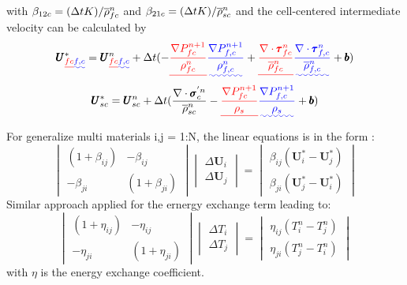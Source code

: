 \documentclass[preprint,12pt]{elsarticle}
\providecommand{\DIFadd}[1]{{\protect\color{blue}\uwave{#1}}} %
\providecommand{\DIFdel}[1]{{\protect\color{red}\sout{#1}}}                      %
\providecommand{\DIFaddbegin}{} %
\providecommand{\DIFaddend}{} %
\providecommand{\DIFdelbegin}{} %
\providecommand{\DIFdelend}{} %
\newcommand{\DIFscaledelfig}{0.5}
\newlength{\DIFdelgraphicswidth} %
\newlength{\DIFdelgraphicsheight} %
\newcommand{\DIFaddincludegraphics}[2][]{{\color{blue}\fbox{\DIFOincludegraphics[#1]{#2}}}} %
\newcommand{\DIFdelincludegraphics}[2][]{%
\sbox{\DIFdelgraphicsbox}{\DIFOincludegraphics[#1]{#2}}%
\settoboxwidth{\DIFdelgraphicswidth}{\DIFdelgraphicsbox} %
\settoboxtotalheight{\DIFdelgraphicsheight}{\DIFdelgraphicsbox} %
\scalebox{\DIFscaledelfig}{%
\parbox[b]{\DIFdelgraphicswidth}{\usebox{\DIFdelgraphicsbox}\\[-\baselineskip] \rule{\DIFdelgraphicswidth}{0em}}\llap{\resizebox{\DIFdelgraphicswidth}{\DIFdelgraphicsheight}{%
\setlength{\unitlength}{\DIFdelgraphicswidth}%
\begin{picture}(1,1)%
\thicklines\linethickness{2pt} %
{\color[rgb]{1,0,0}\put(0,0){\framebox(1,1){}}}%
{\color[rgb]{1,0,0}\put(0,0){\line( 1,1){1}}}%
{\color[rgb]{1,0,0}\put(0,1){\line(1,-1){1}}}%
\end{picture}%
}\hspace*{3pt}}} %
} %
\DeclareRobustCommand{\DIFaddbegin}{\DIFOaddbegin \let\includegraphics\DIFaddincludegraphics} %
\DeclareRobustCommand{\DIFaddend}{\DIFOaddend \let\includegraphics\DIFOincludegraphics} %
\DeclareRobustCommand{\DIFdelbegin}{\DIFOdelbegin \let\includegraphics\DIFdelincludegraphics} %
\DeclareRobustCommand{\DIFdelend}{\DIFOaddend \let\includegraphics\DIFOincludegraphics} %
\begin{document}
%
%
with \DIFdelbegin \DIFdel{$\beta_{12c} = (\Delta{t} K)/\overline{\rho}_{fc}^n$ }\DIFdelend \DIFaddbegin \DIFadd{$\beta_{12c} = (\delt K)/\overline{\rho}_{f,c}^n$ }\DIFaddend and $\beta_{21c} = (\Delta{t} K)/\overline{\rho}_{sc}^n$ and the cell-centered intermediate velocity can be calculated by\DIFaddbegin \DIFadd{:
}\DIFaddend %
\begin{equation}
\begin{gathered}
\pmb{U}_{\DIFdelbegin \DIFdel{fc}\DIFdelend \DIFaddbegin \DIFadd{f,c}\DIFaddend }^{*} = \pmb{U}_{\DIFdelbegin \DIFdel{fc}\DIFdelend \DIFaddbegin \DIFadd{f,c}\DIFaddend }^{n} + \delt (-\DIFdelbegin \DIFdel{\frac{\nabla P_{fc}^{n+1}}{\rho_{fc}^n}  }\DIFdelend \DIFaddbegin \DIFadd{\frac{\nabla P_{f,c}^{n+1}}{\rho_{f,c}^n}  }\DIFaddend + \DIFdelbegin \DIFdel{\frac{\nabla \cdot \pmb{\tau}_{fc}^{n}}{\overline{\rho}^n_{fc}} }\DIFdelend \DIFaddbegin \DIFadd{\frac{\nabla \cdot \pmb{\tau}_{f,c}^{n}}{\overline{\rho}^n_{f,c}} }\DIFaddend + \pmb{b}) \\
\pmb{U}_{sc}^{*} = \pmb{U}_{sc}^{n} + \delt (\frac{\nabla \cdot \pmb{\sigma}_c^{'n}}{\overline{\rho}^n_{sc}}    - \DIFdelbegin \DIFdel{\frac{\nabla P_{fc}^{n+1}}{\rho_s}  }\DIFdelend \DIFaddbegin \DIFadd{\frac{\nabla P_{f,c}^{n+1}}{\rho_s}  }\DIFaddend + \pmb{b})
\end {gathered}
\end {equation}
%
For generalize multi materials i,j = 1:N, the linear equations is in the form \DIFaddbegin \DIFadd{as}\DIFaddend :
%
%
\[ \begin{vmatrix} (1 + \beta_{ij})  &  -\beta_{ij} \\
                  -\beta_{ji}       &  (1 + \beta_{ji})
    \end {vmatrix}
    \begin{vmatrix} \Delta \pmb{U}_{i} \\
                    \Delta \pmb{U}_{j}
    \end {vmatrix}
    =
    \begin{vmatrix}  \beta_{ij}(\pmb{U}_{i}^{*} - \pmb{U}_{j}^{*}) \\
                    \beta_{ji}(\pmb{U}_{j}^{*} - \pmb{U}_i^{*})
    \end {vmatrix}                
\]
Similar approach applied for the ernergy exchange term leading to:
%
%
\[ \begin{vmatrix} (1 + \eta_{ij})  &  -\eta_{ij} \\
                  -\eta_{ji}       &  (1 + \eta_{ji})
    \end {vmatrix}
    \begin{vmatrix} \Delta T_{i} \\
                    \Delta T_{j}
    \end {vmatrix}
    =
    \begin{vmatrix}  \eta_{ij}(T_{i}^{n} - T_{j}^{n}) \\
                    \eta_{ji}(T_{j}^{n} - T_i^{n})
    \end {vmatrix}                
\]
with $\eta$ is the energy exchange coefficient.
%
%
\end{document}
